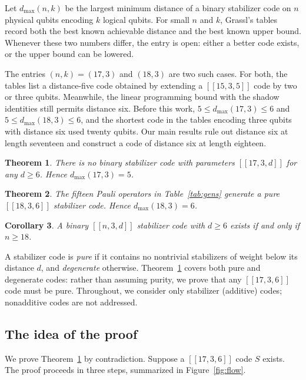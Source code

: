 \documentclass[11pt]{article}
\newtheorem{theorem}{Theorem}[section]
\newtheorem{corollary}[theorem]{Corollary}
\theoremstyle{definition}
\theoremstyle{remark}
\newcommand{\qc}[1]{[\![#1]\!]}
\begin{document}
Let \(d_{\max}(n,k)\) be the largest minimum distance of a binary
stabilizer code on \(n\) physical qubits encoding \(k\) logical qubits.
For small \(n\) and \(k\), Grassl's tables \cite{grassl} record both the
best known achievable distance and the best known upper bound. Whenever
these two numbers differ, the entry is open: either a better code
exists, or the upper bound can be lowered.

The entries \((n,k)=(17,3)\) and \((18,3)\) are two such cases. For
both, the tables list a distance-five code obtained by extending a
\(\qc{15,3,5}\) code by two or three qubits. Meanwhile, the linear
programming bound with the shadow identities
\cite{shorlaflamme,rains98,ashikhmin,rains} still permits distance six.
Before this work, \(5\leq d_{\max}(17,3)\leq6\) and
\(5\leq d_{\max}(18,3)\leq6\), and the shortest code in the tables
encoding three qubits with distance six used twenty qubits. Our main
results rule out distance six at length seventeen and construct a code
of distance six at length eighteen.

\begin{theorem}\label{thm:main}
There is no binary stabilizer code with parameters \(\qc{17,3,d}\) for
any \(d\geq6\). Hence \(d_{\max}(17,3)=5\).
\end{theorem}

\begin{theorem}\label{thm:code}
The fifteen Pauli operators in Table~\ref{tab:gens} generate a pure
\(\qc{18,3,6}\) stabilizer code. Hence \(d_{\max}(18,3)=6\).
\end{theorem}

\begin{corollary}\label{cor:length}
A binary \(\qc{n,3,d}\) stabilizer code with \(d\geq6\) exists if and
only if \(n\geq18\).
\end{corollary}

A stabilizer code is \emph{pure} if it contains no nontrivial
stabilizers of weight below its distance \(d\), and \emph{degenerate}
otherwise. Theorem~\ref{thm:main} covers both pure and degenerate codes:
rather than assuming purity, we prove that any \(\qc{17,3,6}\) code must
be pure. Throughout, we consider only stabilizer (additive) codes;
nonadditive codes are not addressed.

\subsection*{The idea of the proof}

We prove Theorem~\ref{thm:main} by contradiction. Suppose a
\(\qc{17,3,6}\) code \(S\) exists. The proof proceeds in three steps,
summarized in Figure~\ref{fig:flow}.
\end{document}
